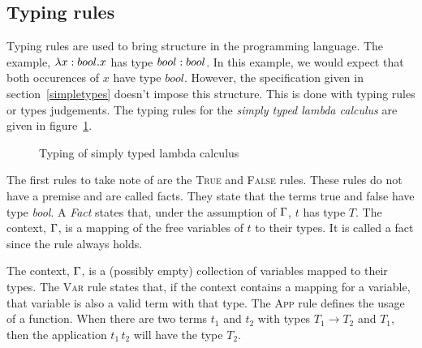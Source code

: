 \subsection{Typing rules}
Typing rules are used to bring structure in the programming language. The example, $\lambda x \mathrel{:} bool . x$ has type $bool \mathrel{:} bool$. In this example, we would expect that both occurences of $x$ have type $bool$. However, the specification given in section~\ref{simpletypes} doesn't impose this structure. This is done with typing rules or types judgements. The typing rules for the \textit{simply typed lambda calculus} are given in figure~\ref{fig:lambda-typing}.
\begin{figure}[H]
\begin{center}
\end{center}
\caption{Typing of simply typed lambda calculus}\label{fig:lambda-typing}
\end{figure}
The first rules to take note of are the \textsc{True} and \textsc{False} rules. These rules do not have a premise and are called facts. They state that the terms true and false have type \textit{bool}. A \textit{Fact} states that, under the assumption of $\Gamma$, $t$ has type $T$. The context, $\Gamma$, is a mapping of the free variables of $t$ to their types. It is called a fact since the rule always holds.

The context, $\Gamma$, is a (possibly empty) collection of variables mapped to their types. The \textsc{Var} rule states that, if the context contains a mapping for a variable, that variable is also a valid term with that type. The \textsc{App} rule defines the usage of a function. When there are two terms $t_1$ and $t_2$ with types $T_1 \to T_2$ and $T_1$, then the application $t_1 \, t_2$ will have the type $T_2$.  

